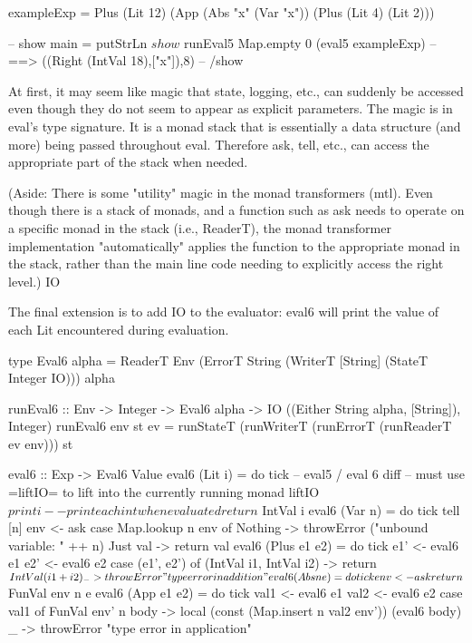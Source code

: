 exampleExp = Plus (Lit 12) (App (Abs "x" (Var "x")) (Plus (Lit 4) (Lit 2)))

-- show
main = putStrLn $ show $ runEval5 Map.empty 0 (eval5 exampleExp)
       -- ==> ((Right (IntVal 18),["x"]),8)
-- /show

At first, it may seem like magic that state, logging, etc., can suddenly be accessed even though they do not seem to appear as explicit parameters. The magic is in eval's type signature. It is a monad stack that is essentially a data structure (and more) being passed throughout eval. Therefore ask, tell, etc., can access the appropriate part of the stack when needed.

(Aside: There is some "utility" magic in the monad transformers (mtl). Even though there is a stack of monads, and a function such as ask needs to operate on a specific monad in the stack (i.e., ReaderT), the monad transformer implementation "automatically" applies the function to the appropriate monad in the stack, rather than the main line code needing to explicitly access the right level.)
IO

The final extension is to add IO to the evaluator: eval6 will print the value of each Lit encountered during evaluation.

type Eval6 alpha = ReaderT Env  (ErrorT String (WriterT [String] (StateT Integer IO))) alpha

runEval6           ::  Env -> Integer -> Eval6 alpha -> IO ((Either String alpha, [String]), Integer)
runEval6 env st ev  =  runStateT (runWriterT (runErrorT (runReaderT ev env))) st

eval6             :: Exp -> Eval6 Value
eval6 (Lit  i)     = do tick
                        -- eval5 / eval 6 diff
                        -- must use =liftIO= to lift into the currently running monad
                        liftIO $ print i -- print each int when evaluated
                        return $ IntVal i
eval6 (Var  n)     = do tick
                        tell [n]
                        env <- ask
                        case Map.lookup n env of
                            Nothing  -> throwError ("unbound variable: " ++ n)
                            Just val -> return val
eval6 (Plus e1 e2) = do tick
                        e1'  <- eval6 e1
                        e2'  <- eval6 e2
                        case (e1', e2') of
                            (IntVal i1, IntVal i2) -> return $ IntVal (i1 + i2)
                            _                      -> throwError "type error in addition"
eval6 (Abs  n  e)  = do tick
                        env <- ask
                        return $ FunVal env n e
eval6 (App  e1 e2) = do tick
                        val1  <- eval6 e1
                        val2  <- eval6 e2
                        case val1 of
                            FunVal env' n body -> local (const (Map.insert n val2 env')) (eval6 body)
                            _                  -> throwError "type error in application"

